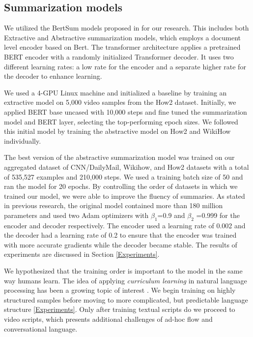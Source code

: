 \documentclass[sigconf]{acmart}
\begin{document}
\subsection{Summarization models}

We utilized the BertSum models proposed in \cite{liu-lapata-2019-text}  for our research. This includes both Extractive and Abstractive summarization models, which employs a document level encoder based on Bert. The transformer architecture applies a pretrained BERT encoder with a randomly initialized Transformer decoder. It uses two different learning rates: a low rate for the encoder and a separate higher rate for the decoder to enhance learning.

We used a 4-GPU Linux machine and initialized a baseline by training an extractive model on 5,000 video samples from the How2 dataset.  Initially, we applied BERT base uncased with 10,000 steps and fine tuned the summarization model and BERT layer, selecting the top-performing epoch sizes. We followed this initial model by training the abstractive model on How2 and WikiHow individually.


The best version of the abstractive summarization model was trained on our aggregated dataset of CNN/DailyMail, Wikihow, and How2 datasets with a total of 535,527 examples and 210,000 steps. We used a training batch size of 50 and ran the model for 20 epochs. By controlling the order of datasets in which we trained our model, we were able to improve the fluency of summaries. As stated in previous research, the original model contained more than 180 million parameters and used two Adam optimizers with $\beta_1$=0.9 and $\beta_2$ =0.999 for the encoder and decoder respectively. The encoder used a learning rate of 0.002 and the decoder had a learning rate of 0.2 to ensure that the encoder was trained with more accurate gradients while the decoder became stable. The results of experiments are discussed in Section \ref{Experiments}.

We hypothesized that the training order is important to the model in the same way humans learn. The idea of applying \emph{curriculum learning} \cite{conf/icml/BengioLCW09} in natural language processing has been a growing topic of interest \cite{xu-etal-2020-curriculum}. We begin training on highly structured samples before moving to more complicated, but predictable language structure \ref{Experiments}. Only after training textual scripts do we proceed to video scripts, which presents additional challenges of ad-hoc flow and conversational language.
\end{document}
